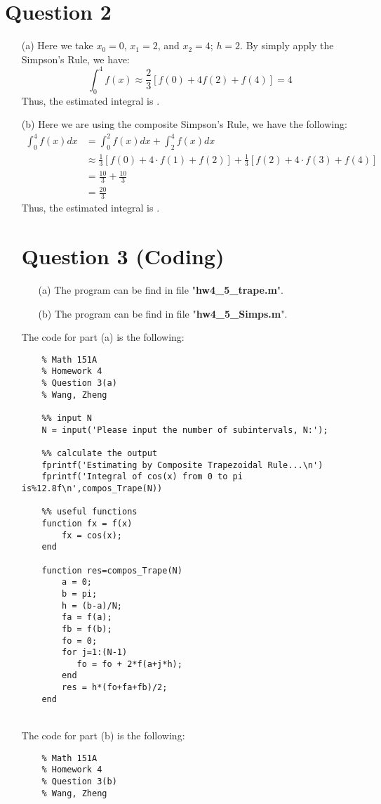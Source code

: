 \documentclass[11pt]{article}
\newcommand*{\boxtex}[1]{\framebox{#1}}
\begin{document}
\section*{Question 2}
\begin{itemize}
	\item [(a)]
	Here we take $ x_0 = 0 $, $ x_1  = 2$, and $ x_2  = 4$; $ h = 2 $. By simply apply the Simpson's Rule, we have:
	\[ \int_{0}^{4} f(x) \approx \frac{2}{3}[f(0) + 4f(2) + f(4)] = 4 \]
	Thus, the estimated integral is \boxtex{$ \int_{0}^{4}f(x)dx \approx 4 $}.
	
	\item [(b)]
	Here we are using the composite Simpson's Rule, we have the following:
	\begin{equation*}
	\begin{aligned}
	\int_{0}^{4} f(x) dx &= \int_{0}^{2} f(x) dx + \int_{2}^{4} f(x) dx\\
	&\approx \frac{1}{3}[f(0) + 4\cdot f(1) + f(2)] + \frac{1}{3}[f(2) + 4\cdot f(3) + f(4)]\\
	&= \frac{10}{3} + \frac{10}{3}\\
	&=\frac{20}{3}
	\end{aligned}
	\end{equation*}
	Thus, the estimated integral is \boxtex{$ \int_{0}^{4}f(x)dx \approx \frac{20}{3} $}.
	
\section*{Question 3 (Coding)}
\begin{itemize}
	\item [(a)]
	The program can be find in file "\textbf{hw4\_5\_trape.m}".
	\item [(b)]
	The program can be find in file "\textbf{hw4\_5\_Simps.m}".
\end{itemize}	
	The code for part (a) is the following:
	\begin{verbatim}
	% Math 151A
	% Homework 4
	% Question 3(a)
	% Wang, Zheng 
	
	%% input N
	N = input('Please input the number of subintervals, N:');
	
	%% calculate the output
	fprintf('Estimating by Composite Trapezoidal Rule...\n')
	fprintf('Integral of cos(x) from 0 to pi is%12.8f\n',compos_Trape(N))
	
	%% useful functions
	function fx = f(x)
	    fx = cos(x);
	end
	
	function res=compos_Trape(N)
	    a = 0;
	    b = pi;
    	h = (b-a)/N;
	    fa = f(a);
	    fb = f(b);
	    fo = 0;
	    for j=1:(N-1)
	       fo = fo + 2*f(a+j*h);
	    end
	    res = h*(fo+fa+fb)/2;
	end
	\end{verbatim}
	\hfill\\
	The code for part (b) is the following:
	\begin{verbatim}
	% Math 151A
	% Homework 4
	% Question 3(b)
	% Wang, Zheng 
	

\end{verbatim}
\end{itemize}
\end{document}
